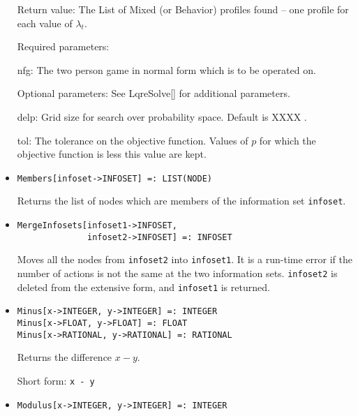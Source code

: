 \begin{itemize}
\item
[Return value:] The List of Mixed (or Behavior) profiles found -- one
profile for each value of $\lambda_t$. 

\item
[Required parameters:]\hfil\null
	
\bd
\item  
[nfg:] The two person game in normal form which is to be operated on.
\ed

\item
[Optional parameters:]  See LqreSolve[] for additional parameters.

\bd
\item
[delp:] Grid size for search over probability space.  Default is XXXX .
\item
[tol:] The tolerance on the objective function.  Values of $p$ for
which the objective function is less this value are kept.  
\ed
\ed


\item
\protect \large \begin{verbatim}
Members[infoset->INFOSET] =: LIST(NODE)
\end{verbatim}\normalsize

\bd
Returns the list of nodes which are members of the information
set \verb+infoset+.
\ed

\item
\protect \large \begin{verbatim}
MergeInfosets[infoset1->INFOSET,
              infoset2->INFOSET] =: INFOSET
\end{verbatim}\normalsize

\bd
Moves all the nodes from \verb+infoset2+ into \verb+infoset1+.
It is a run-time error if the number of actions is not the same at the
two information sets.  \verb+infoset2+ is deleted from the extensive form,
and \verb+infoset1+ is returned.
\ed

\item 
\protect \large \begin{verbatim}
Minus[x->INTEGER, y->INTEGER] =: INTEGER
Minus[x->FLOAT, y->FLOAT] =: FLOAT
Minus[x->RATIONAL, y->RATIONAL] =: RATIONAL
\end{verbatim} \normalsize

\bd
Returns the difference $x - y$.
\item
[Short form:] \verb+x - y+
\ed

\item
\protect \large \begin{verbatim}
Modulus[x->INTEGER, y->INTEGER] =: INTEGER
\end{verbatim}\normalsize


\end{itemize}
